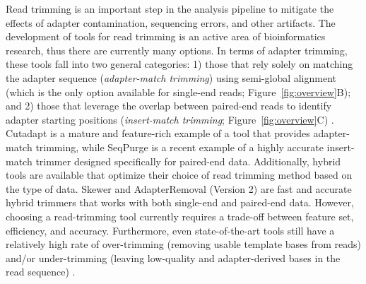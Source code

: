 \documentclass[fleqn,10pt,lineno]{wlpeerj} %
\begin{document}
Read trimming is an important step in the analysis pipeline to mitigate the effects of adapter contamination, sequencing errors, and other artifacts. The development of tools for read trimming is an active area of bioinformatics research, thus there are currently many options. In terms of adapter trimming, these tools fall into two general categories: 1) those that rely solely on matching the adapter sequence (\textit{adapter-match trimming}) using semi-global alignment (which is the only option available for single-end reads; Figure~\ref{fig:overview}B); and 2) those that leverage the overlap between paired-end reads to identify adapter starting positions (\textit{insert-match trimming}; Figure~\ref{fig:overview}C) \citep{sturm_seqpurge:_2016}. Cutadapt \citep{martin_cutadapt_2011} is a mature and feature-rich example of a tool that provides adapter-match trimming, while SeqPurge \citep{sturm_seqpurge:_2016} is a recent example of a highly accurate insert-match trimmer designed specifically for paired-end data. Additionally, hybrid tools are available that optimize their choice of read trimming method based on the type of data. Skewer \citep{jiang_skewer:_2014} and AdapterRemoval (Version 2) \citep{schubert_adapterremoval_2016} are fast and accurate hybrid trimmers that works with both single-end and paired-end data. However, choosing a read-trimming tool currently requires a trade-off between feature set, efficiency, and accuracy. Furthermore, even state-of-the-art tools still have a relatively high rate of over-trimming (removing usable template bases from reads) and/or under-trimming (leaving low-quality and adapter-derived bases in the read sequence) \citep{sturm_seqpurge:_2016}.
\end{document}

